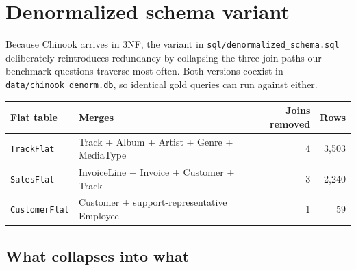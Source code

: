 \documentclass[11pt]{article}
\begin{document}
\section{Denormalized schema variant}\label{sec:denorm}

Because Chinook arrives in 3NF, the variant in \texttt{sql/denormalized\_schema.sql}
deliberately reintroduces redundancy by collapsing the three join paths our benchmark questions
traverse most often. Both versions coexist in \texttt{data/chinook\_denorm.db}, so identical gold
queries can run against either.

\begin{center}
\begin{tabular}{@{}llrr@{}}
\toprule
\textbf{Flat table} & \textbf{Merges} & \textbf{Joins removed} & \textbf{Rows} \\
\midrule
\texttt{TrackFlat}    & Track + Album + Artist + Genre + MediaType & 4 & 3{,}503 \\
\texttt{SalesFlat}    & InvoiceLine + Invoice + Customer + Track   & 3 & 2{,}240 \\
\texttt{CustomerFlat} & Customer + support-representative Employee & 1 & 59 \\
\bottomrule
\end{tabular}
\end{center}

\subsection{What collapses into what}
\end{document}

